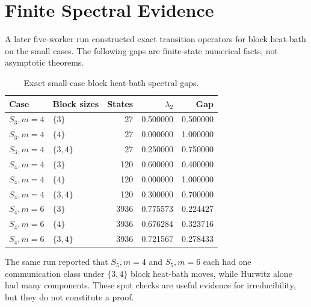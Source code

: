 \section{Finite Spectral Evidence}

A later five-worker run constructed exact transition operators for block
heat-bath on the small cases.  The following gaps are finite-state numerical
facts, not asymptotic theorems.

\begin{table}[ht]
\centering
\begin{tabular}{llrrr}
\toprule
Case & Block sizes & States & $\lambda_2$ & Gap \\
\midrule
$S_3,m=4$ & $\{3\}$ & 27 & 0.500000 & 0.500000 \\
$S_3,m=4$ & $\{4\}$ & 27 & 0.000000 & 1.000000 \\
$S_3,m=4$ & $\{3,4\}$ & 27 & 0.250000 & 0.750000 \\
$S_4,m=4$ & $\{3\}$ & 120 & 0.600000 & 0.400000 \\
$S_4,m=4$ & $\{4\}$ & 120 & 0.000000 & 1.000000 \\
$S_4,m=4$ & $\{3,4\}$ & 120 & 0.300000 & 0.700000 \\
$S_4,m=6$ & $\{3\}$ & 3936 & 0.775573 & 0.224427 \\
$S_4,m=6$ & $\{4\}$ & 3936 & 0.676284 & 0.323716 \\
$S_4,m=6$ & $\{3,4\}$ & 3936 & 0.721567 & 0.278433 \\
\bottomrule
\end{tabular}
\caption{Exact small-case block heat-bath spectral gaps.}
\label{tab:spectral}
\end{table}

The same run reported that $S_5,m=4$ and $S_5,m=6$ each had one communication
class under $\{3,4\}$ block heat-bath moves, while Hurwitz alone had many
components.  These spot checks are useful evidence for irreducibility, but
they do not constitute a proof.

